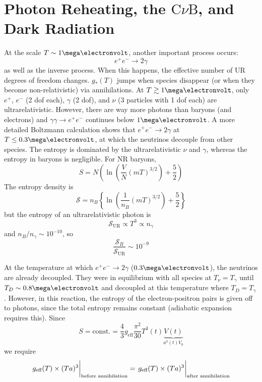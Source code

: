 \documentclass[a4paper,twoside,master.tex]{subfiles}
\begin{document}
\section{Photon Reheating, the $\text{C} \nu \text{B}$, and Dark Radiation}\label{sec:photon_reheating,_the_cnb,_and_dark_radiation}

At the scale $ T \sim 1 \mega\electronvolt $, another important process occurs:
\begin{equation}
    e^+ e^- \to 2 \gamma
\end{equation}
as well as the inverse process. When this happens, the effective number of UR degrees of freedom changes. $ g_*(T) $ jumps when species disappear (or when they become non-relativistic) via annihilations. At $ T \gtrsim 1 \mega\electronvolt $, only $ e^+ $, $ e^- $ (2 dof each), $ \gamma $ (2 dof), and $ \nu $ (3 particles with 1 dof each) are ultrarelativistic. However, there are way more photons than baryons (and electrons) and $ \gamma \gamma \to e^+ e^- $ continues below $ 1 \mega\electronvolt $. A more detailed Boltzmann calculation shows that $ e^+ e^- \to 2 \gamma $ at $ T \leq 0.3 \mega\electronvolt $, at which the neutrinos decouple from other species. The entropy is dominated by the ultrarelativistic $ \nu $ and $ \gamma $, whereas the entropy in baryons is negligible. For NR baryons,
\begin{equation}
    S = N \left( \ln(\frac{V}{N} (mT)^{3/2}) + \frac{5}{2} \right) \tag{Sackur-Tetrode Equation}
\end{equation}
The entropy density is
\begin{equation}
    \mathcal{S} = n_B \left\{ \ln(\frac{1}{n_B} (mT)^{3/2}) + \frac{5}{2} \right\}
\end{equation}
but the entropy of an ultrarelativistic photon is
\begin{equation}
    \mathcal{S}_{\text{UR}} \propto T^3 \propto n_{\gamma}
\end{equation}
and $ n_B / n_{\gamma} \sim 10^{-10} $, so 
\begin{equation}
    \frac{\mathcal{S}_B}{\mathcal{S}_{\text{UR}}} \sim 10^{-9}
\end{equation}

At the temperature at which $ e^+ e^- \to 2 \gamma $ ($ 0.3 \mega\electronvolt $), the neutrinos are already decoupled. They were in equilibrium with all species at $ T_{\nu} = T_{\gamma} $ until $ T_D \sim 0.8 \mega\electronvolt $ and decoupled at this temperature where $ T_D = T_{\gamma} $. However, in this reaction, the entropy of the electron-positron pairs is given off to photons, since the total entropy remains constant (adiabatic expansion requires this). Since
\begin{equation}
    S = \text{const.} = \frac{4}{3} g_{\text{eff}} \frac{\pi^2}{30} T^3(t) \underbrace{V(t)}_{a^3(t) V_0}
\end{equation}
we require
\begin{equation}
    \eval{g_{\text{eff}}(T) \times (T a)^3}_{\text{before annihilation}} = \eval{g_{\text{eff}}(T) \times (T a)^3}_{\text{after annihilation}}
\end{equation}
\end{document}
